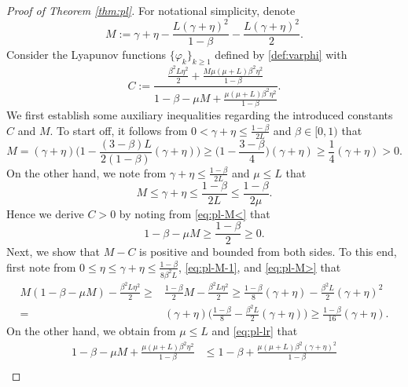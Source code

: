 \documentclass[10pt,a4paper]{amsart}
\begin{document}
\begin{proof}[Proof of Theorem \ref{thm:pl}]
For notational simplicity, denote
\[
    M:=\gamma+\eta-\frac{L(\gamma+\eta)^2}{1-\beta}-\frac{L(\gamma+\eta)^2}{2}.
\]
Consider the Lyapunov functions $\{\varphi_k\}_{k\ge 1}$ defined by \eqref{def:varphi} with
\begin{equation}\label{def:C}
C:=\frac{\frac{\beta^2 L \eta^2}{2}+\frac{M \mu(\mu+L) \beta^2 \eta^2}{1-\beta}}{1-\beta-\mu M+\frac{\mu(\mu+L) \beta^2 \eta^2}{1-\beta}}.
\end{equation}
We first establish some auxiliary inequalities regarding the introduced constants $C$ and $M$. To start off, it follows from $0<\gamma+\eta \leq \frac{1-\beta}{2 L}$ and $\beta\in[0,1)$ that
\begin{equation}\label{eq:pl-M>}
    M=(\gamma+\eta)\Big(1-\frac{(3-\beta) L}{2(1-\beta)}(\gamma+\eta)\Big) \ge \Big(1-\frac{3-\beta}{4}\Big)(\gamma+\eta) \ge \frac{1}{4}(\gamma+\eta)>0.
\end{equation}
On the other hand, we note from $\gamma+\eta\leq\frac{1-\beta}{2 L}$ and $\mu\leq L$ that
\begin{equation}\label{eq:pl-M<}
    M \leq \gamma+\eta \leq \frac{1-\beta}{2 L}\leq\frac{1-\beta}{2 \mu}.
\end{equation}
Hence we derive $C>0$ by noting from \eqref{eq:pl-M<} that
\begin{equation}\label{eq:pl-M-1}
1-\beta-\mu M \ge \frac{1-\beta}{2}\ge 0.
\end{equation}
Next, we show that $M-C$ is positive and bounded from both sides. To this end, first note from $0\leq\eta\leq\gamma+\eta \leq \frac{1-\beta}{8 \beta^2 L}$, \eqref{eq:pl-M-1}, and \eqref{eq:pl-M>} that
\begin{equation}\label{eq:pl-M-C-1}
\begin{aligned}
M(1-\beta-\mu M)-\frac{\beta^2 L\eta^2}{2} \ge& \frac{1-\beta}{2} M-\frac{\beta^2 L \eta^2}{2} \ge \frac{1-\beta}{8}(\gamma+\eta)-\frac{\beta^2 L}{2}(\gamma+\eta)^2 \\
= & (\gamma+\eta)\Big(\frac{1-\beta}{8}-\frac{\beta^2 L}{2}(\gamma+\eta)\Big) \ge \frac{1-\beta}{16}(\gamma+\eta).
\end{aligned}
\end{equation}
On the other hand, we obtain from $\mu\leq L$ and \eqref{eq:pl-lr} that
\begin{equation}\label{eq:pl-M-C-2}
\begin{aligned}
1-\beta-\mu M+\frac{\mu(\mu+L) \beta^2 \eta^2}{1-\beta} & \leq 1-\beta+\frac{\mu(\mu+L) \beta^2(\gamma+\eta)^2}{1-\beta} \\

\end{aligned}
\end{equation}
\end{proof}
\end{document}
